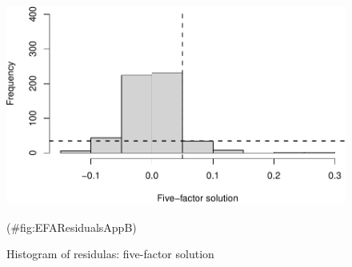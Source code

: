 \begin{appendix}
\begin{figure}

{\centering \includegraphics{manuscript_files/figure-latex/EFAResidualsAppB-1} 

}

\caption{ Histogram of residulas:  five-factor solution}(\#fig:EFAResidualsAppB)
\end{figure}
\end{appendix}
